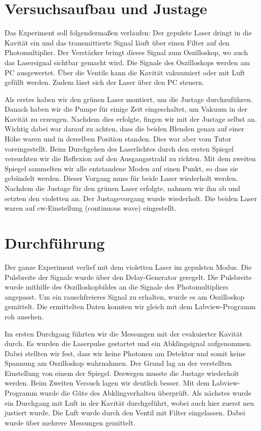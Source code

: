 \section{Versuchsaufbau und Justage}


Das Experiment soll folgendermaßen verlaufen:
Der gepulste Laser dringt in die Kavität ein und das transmittierte Signal läuft über einen Filter auf den Photomultiplier. Der Verstärker bringt dieses Signal zum Oszilloskop, wo auch das Lasersignal sichtbar gemacht wird. Die Signale des Oszilloskops werden am PC ausgewertet. Über die Ventile kann die Kavität vakuumiert oder mit Luft gefüllt werden. Zudem lässt sich der Laser über den PC steuern.

Als erstes haben wir den grünen Laser montiert, um die Justage durchzuführen. Danach haben wir die Pumpe für einige Zeit eingeschaltet, um Vakuum in der Kavität zu erzeugen. Nachdem dies erfolgte, fingen wir mit der Justage selbst an. Wichtig dabei war darauf zu achten, dass die beiden Blenden genau auf einer Höhe waren und in derselben Position standen. Dies war aber vom Tutor voreingestellt. Beim Durchgehen des Laserlichtes durch den ersten Spiegel versuchten wir die Reflexion auf den Ausgangsstrahl zu richten. Mit dem zweiten Spiegel sammelten wir alle entstandene Moden auf einen Punkt, so dass sie gebündelt werden. Dieser Vorgang muss für beide Laser wiederholt werden.
Nachdem die Justage für den grünen Laser erfolgte, nahmen wir ihn ab und setzten den violetten an. Der Justagevorgang wurde wiederholt.
Die beiden Laser waren auf cw-Einstellung (continuous wave) eingestellt.

\section{Durchführung}

Der ganze Experiment verlief mit dem violetten Laser im gepulsten Modus. Die Pulsbreite der Signale wurde über den Delay-Generator geregelt. Die Pulsbreite wurde mithilfe des Oszilloskopbildes an die Signale des Photomultipliers angepasst. Um ein rauschfreieres Signal zu erhalten, wurde es am Oszilloskop gemittelt. Die ermittelten Daten konnten wir gleich mit dem Labview-Programm roh ansehen. 

Im ersten Durchgang führten wir die Messungen mit der evakuierter Kavität durch. Es wurden die Laserpulse gestartet und ein Abklingsignal aufgenommen. Dabei stellten wir fest, dass wir keine Photonen am Detektor und somit keine Spannung am Oszilloskop wahrnahmen. Der Grund lag an der verstellten Einstellung von einem der Spiegel. Deswegen musste die Justage wiederholt werden. Beim Zweiten Versuch lagen wir deutlich besser. Mit dem Labview-Programm wurde die Güte des Abklingverhalten überprüft. 
Als nächstes wurde ein Durchgang mit Luft in der Kavität durchgeführt, wobei auch hier zuerst neu justiert wurde. Die Luft wurde durch den Ventil mit Filter eingelassen. Dabei wurde über mehrere Messungen gemittelt.


